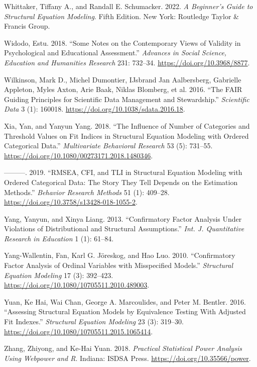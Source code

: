 \documentclass[
  a4paper,
]{article}
\newlength{\cslhangindent}
\newenvironment{CSLReferences}[2] %
 {\begin{list}{}{%
  \setlength{\itemindent}{0pt}
  \setlength{\leftmargin}{0pt}
  \setlength{\parsep}{0pt}
  \ifodd #1
   \setlength{\leftmargin}{\cslhangindent}
   \setlength{\itemindent}{-1\cslhangindent}
  \fi
  \setlength{\itemsep}{#2\baselineskip}}}
 {\end{list}}
\begin{document}
\begin{CSLReferences}{1}{0}
Whittaker, Tiffany A., and Randall E. Schumacker. 2022. \emph{A
{Beginner}'s {Guide} to {Structural Equation Modeling}}. Fifth Edition.
New York: Routledge Taylor \& Francis Group.

Widodo, Estu. 2018. {``Some {Notes} on the {Contemporary Views} of
{Validity} in {Psychological} and {Educational Assessment}.''}
\emph{Advances in Social Science, Education and Humanities Research}
231: 732--34. \url{https://doi.org/10.3968/8877}.

Wilkinson, Mark D., Michel Dumontier, IJsbrand Jan Aalbersberg,
Gabrielle Appleton, Myles Axton, Arie Baak, Niklas Blomberg, et al.
2016. {``The {FAIR Guiding Principles} for Scientific Data Management
and Stewardship.''} \emph{Scientific Data} 3 (1): 160018.
\url{https://doi.org/10.1038/sdata.2016.18}.

Xia, Yan, and Yanyun Yang. 2018. {``The {Influence} of {Number} of
{Categories} and {Threshold Values} on {Fit Indices} in {Structural
Equation Modeling} with {Ordered Categorical Data}.''}
\emph{Multivariate Behavioral Research} 53 (5): 731--55.
\url{https://doi.org/10.1080/00273171.2018.1480346}.

---------. 2019. {``{RMSEA}, {CFI}, and {TLI} in Structural Equation
Modeling with Ordered Categorical Data: {The} Story They Tell Depends on
the Estimation Methods.''} \emph{Behavior Research Methods} 51 (1):
409--28. \url{https://doi.org/10.3758/s13428-018-1055-2}.

Yang, Yanyun, and Xinya Liang. 2013. {``Confirmatory Factor Analysis
Under Violations of Distributional and Structural Assumptions.''}
\emph{Int. J. Quantitative Research in Education} 1 (1): 61--84.

Yang-Wallentin, Fan, Karl G. Jöreskog, and Hao Luo. 2010.
{``Confirmatory Factor Analysis of Ordinal Variables with Misspecified
Models.''} \emph{Structural Equation Modeling} 17 (3): 392--423.
\url{https://doi.org/10.1080/10705511.2010.489003}.

Yuan, Ke Hai, Wai Chan, George A. Marcoulides, and Peter M. Bentler.
2016. {``Assessing {Structural Equation Models} by {Equivalence Testing
With Adjusted Fit Indexes}.''} \emph{Structural Equation Modeling} 23
(3): 319--30. \url{https://doi.org/10.1080/10705511.2015.1065414}.

Zhang, Zhiyong, and Ke-Hai Yuan. 2018. \emph{Practical Statistical Power
Analysis Using {Webpower} and {R}}. Indiana: ISDSA Press.
\url{https://doi.org/10.35566/power}.

\end{CSLReferences}
\end{document}

